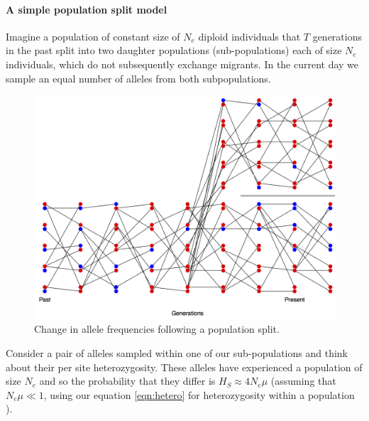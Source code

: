 \paragraph{A simple population split model}
Imagine a population of constant size of $N_e$ diploid individuals that
$T$ generations in the past split into two daughter populations (sub-populations)
each of size $N_e$ individuals, which do not subsequently exchange
migrants. In the current day we sample an equal number of alleles
from both subpopulations. 

\begin{figure}
\begin{center}
\includegraphics[width= 0.8 \textwidth]{figures/drift_split.png}
\end{center}
\caption{Change in allele frequencies following a population split. } \label{fig:drift_split}  
\end{figure} 

Consider a pair of alleles sampled within one of our
sub-populations and think about their per site heterozygosity. 
These alleles have experienced a population of size $N_e$
and so the probability that they differ is $H_S \approx 4N_e \mu$ (assuming that $N_e \mu \ll 1$, using our equation  \ref{eqn:hetero} for heterozygosity within a population ).



